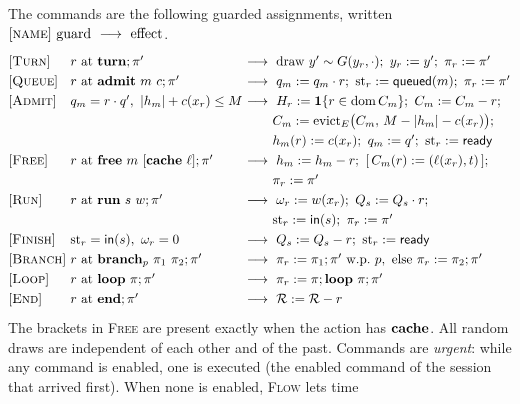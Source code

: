 \begin{definition}\label{L1:def:semantics}
The commands are the following guarded assignments, written
$[\textsc{name}]\ \text{guard}\ \longrightarrow\ \text{effect}$.
\[
\renewcommand{\arraystretch}{1.25}
\begin{array}{@{}l@{\ }l@{\ }l@{}}
{[\textsc{Turn}]} & r \text{ at } \kw{turn};\pi'
  &\longrightarrow\ \text{draw } y'\sim G(y_r,\cdot);\ y_r:=y';\ \pi_r:=\pi'\\
{[\textsc{Queue}]} & r \text{ at } \kw{admit}\ m\ c;\pi'
  &\longrightarrow\ q_m:=q_m\cdot r;\ \mathrm{st}_r:=\mathsf{queued}(m);\ \pi_r:=\pi'\\
{[\textsc{Admit}]} & q_m=r\cdot q',\ |h_m|+c(x_r)\le M
  &\longrightarrow\ H_r:=\1\{r\in\operatorname{dom}C_m\};\ C_m:=C_m-r;\\
&&\phantom{\longrightarrow}\ C_m:=\mathrm{evict}_E\bigl(C_m,\,M-|h_m|-c(x_r)\bigr);\\
&&\phantom{\longrightarrow}\ h_m(r):=c(x_r);\ q_m:=q';\ \mathrm{st}_r:=\mathsf{ready}\\
{[\textsc{Free}]} & r \text{ at } \kw{free}\ m\ [\kw{cache}\ \ell];\pi'
  &\longrightarrow\ h_m:=h_m-r;\ [\,C_m(r):=(\ell(x_r),t)\,];\\
&&\phantom{\longrightarrow}\ \pi_r:=\pi'\\
{[\textsc{Run}]} & r \text{ at } \kw{run}\ s\ w;\pi'
  &\longrightarrow\ \omega_r:=w(x_r);\ Q_s:=Q_s\cdot r;\\
&&\phantom{\longrightarrow}\ \mathrm{st}_r:=\mathsf{in}(s);\ \pi_r:=\pi'\\
{[\textsc{Finish}]} & \mathrm{st}_r=\mathsf{in}(s),\ \omega_r=0
  &\longrightarrow\ Q_s:=Q_s-r;\ \mathrm{st}_r:=\mathsf{ready}\\
{[\textsc{Branch}]} & r \text{ at } \kw{branch}_p\ \pi_1\ \pi_2;\pi'
  &\longrightarrow\ \pi_r:=\pi_1;\pi' \text{ w.p.\ } p,\ \text{else } \pi_r:=\pi_2;\pi'\\
{[\textsc{Loop}]} & r \text{ at } \kw{loop}\ \pi;\pi'
  &\longrightarrow\ \pi_r:=\pi;\kw{loop}\ \pi;\pi'\\
{[\textsc{End}]} & r \text{ at } \kw{end};\pi'
  &\longrightarrow\ \mathcal R:=\mathcal R-r
\end{array}
\]
The brackets in \textsc{Free} are present exactly when the action has $\mathbf{cache}$.
All random draws are independent of each other and of the past. Commands are
\emph{urgent}: while any command is enabled, one is executed (the enabled command of
the session that arrived first). When none is enabled, \textsc{Flow} lets time

\end{definition}
